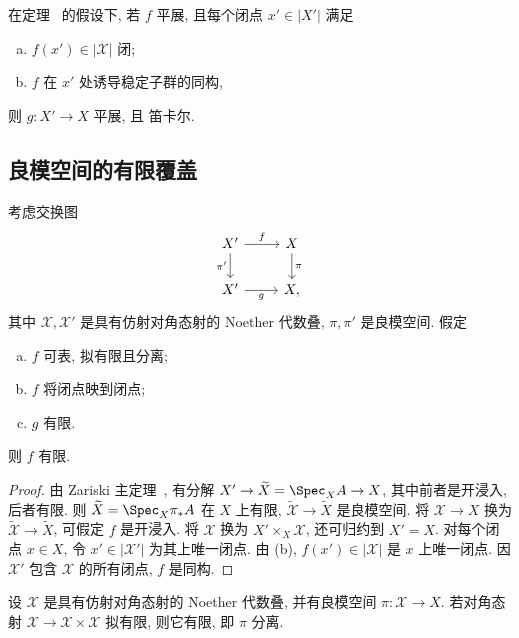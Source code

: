 \begin{corollary}\label{src:7.5.33}
在定理~ 的假设下, 若 $f$ 平展, 且每个闭点 $x'\in|X'|$ 满足
\begin{enumerate}[(a)]
\item $f(x')\in|\mathcal X|$ 闭;
\item $f$ 在 $x'$ 处诱导稳定子群的同构,
\end{enumerate}
则 $g:X'\to X$ 平展, 且  笛卡尔.
\end{corollary}

\subsection{良模空间的有限覆盖}\label{src:7.5.8-subsection}
\begin{proposition}\label{src:7.5.34}
考虑交换图
\begin{align*}
\begin{tikzcd}[ampersand replacement=\&]
\mathcal X'\arrow[r,"{f}"]\arrow[d,"{\pi'}"']\&\mathcal X\arrow[d,"{\pi}"]\\
X'\arrow[r,"{g}"']\&X,
\end{tikzcd}
\end{align*}
其中 $\mathcal X,\mathcal X'$ 是具有仿射对角态射的 Noether 代数叠, $\pi,\pi'$ 是良模空间. 假定
\begin{enumerate}[(a)]
\item $f$ 可表, 拟有限且分离;
\item $f$ 将闭点映到闭点;
\item $g$ 有限.
\end{enumerate}
则 $f$ 有限.
\end{proposition}
\begin{proof}
由 Zariski 主定理~, 有分解 $\mathcal X'\to\widetilde{\mathcal X}=\Spec_{\mathcal X}\mathcal A\to\mathcal X$, 其中前者是开浸入, 后者有限. 则 $\widetilde X=\Spec_X\pi_*\mathcal A$ 在 $X$ 上有限, $\widetilde{\mathcal X}\to\widetilde X$ 是良模空间. 将 $\mathcal X\to X$ 换为 $\widetilde{\mathcal X}\to\widetilde X$, 可假定 $f$ 是开浸入. 将 $\mathcal X$ 换为 $X'\times_X\mathcal X$, 还可归约到 $X'=X$. 对每个闭点 $x\in X$, 令 $x'\in|\mathcal X'|$ 为其上唯一闭点. 由 (b), $f(x')\in|\mathcal X|$ 是 $x$ 上唯一闭点. 因 $\mathcal X'$ 包含 $\mathcal X$ 的所有闭点, $f$ 是同构.
\end{proof}
\begin{proposition}\label{src:7.5.35}
设 $\mathcal X$ 是具有仿射对角态射的 Noether 代数叠, 并有良模空间 $\pi:\mathcal X\to X$. 若对角态射 $\mathcal X\to\mathcal X\times\mathcal X$ 拟有限, 则它有限, 即 $\pi$ 分离.
\end{proposition}
